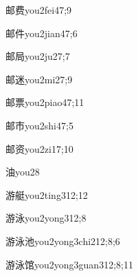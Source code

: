 \begin{verbete}{邮费}{you2fei4}{7;9}
\end{verbete}

\begin{verbete}{邮件}{you2jian4}{7;6}
\end{verbete}

\begin{verbete}{邮局}{you2ju2}{7;7}
\end{verbete}

\begin{verbete}{邮迷}{you2mi2}{7;9}
\end{verbete}

\begin{verbete}{邮票}{you2piao4}{7;11}
\end{verbete}

\begin{verbete}{邮市}{you2shi4}{7;5}
\end{verbete}

\begin{verbete}{邮资}{you2zi1}{7;10}
\end{verbete}

\begin{verbete}{油}{you2}{8}
\end{verbete}

\begin{verbete}{游艇}{you2ting3}{12;12}
\end{verbete}

\begin{verbete}{游泳}{you2yong3}{12;8}
\end{verbete}

\begin{verbete}{游泳池}{you2yong3chi2}{12;8;6}
\end{verbete}

\begin{verbete}{游泳馆}{you2yong3guan3}{12;8;11}
\end{verbete}

